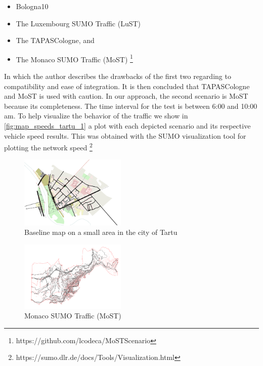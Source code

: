 \documentclass[letter, 10pt, conference]{ieeeconf}
\begin{document}
\begin{itemize}
  \item Bologna10
  \item The Luxembourg SUMO Traffic (LuST)
  \item The TAPASCologne, and
  \item The Monaco SUMO Traffic (MoST) \footnote{https://github.com/lcodeca/MoSTScenario}
\end{itemize}

In which the author describes the drawbacks of the first two regarding to compatibility and ease of integration.
It is then concluded that TAPASCologne and MoST is used with caution.
In our approach, the second scenario is MoST because its completeness.
The time interval for the test is between 6:00 and 10:00 am.
To help visualize the behavior of the traffic we show in \ref{fig:map_speeds_tartu_1} a plot with each depicted scenario and its respective vehicle speed results.
This was obtained with the SUMO visualization tool for plotting the network speed \footnote{https://sumo.dlr.de/docs/Tools/Visualization.html}

\begin{figure}[h]
  \centering
  \includegraphics[width=0.45\textwidth]{map1}
  \caption{Baseline map on a small area in the city of Tartu}
  \label{fig:map1}
\end{figure}

\begin{figure}[h]
  \centering
  \includegraphics[width=0.45\textwidth]{map2}
  \caption{Monaco SUMO Traffic (MoST)}
  \label{fig:map2}
\end{figure}
\end{document}
